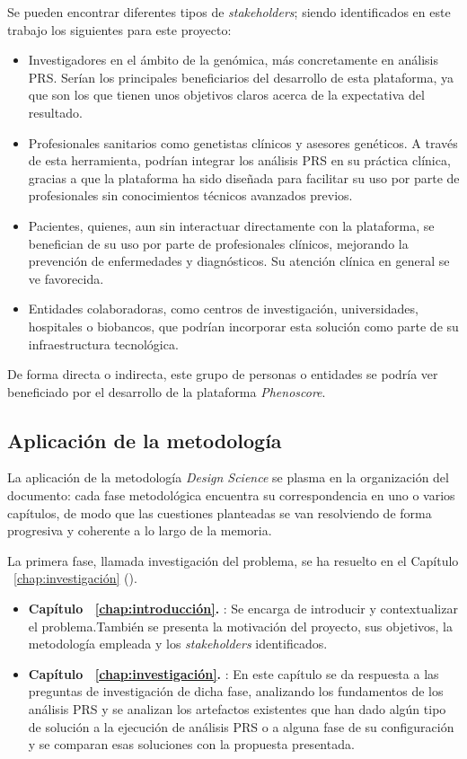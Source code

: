 Se pueden encontrar diferentes tipos de \textit{stakeholders}; siendo identificados en este trabajo los siguientes para este proyecto: 
\begin{itemize}
    \item Investigadores en el ámbito de la genómica, más concretamente en análisis PRS. Serían los principales beneficiarios del desarrollo de esta plataforma, ya que son los que tienen unos objetivos claros acerca de la expectativa del resultado.
    \item Profesionales sanitarios como genetistas clínicos y asesores genéticos. A través de esta herramienta, podrían integrar los análisis PRS en su práctica clínica, gracias a que la plataforma ha sido diseñada para facilitar su uso por parte de profesionales sin conocimientos técnicos avanzados previos.
    \item Pacientes, quienes, aun sin interactuar directamente con la plataforma, se benefician de su uso por parte de profesionales clínicos, mejorando la prevención de enfermedades y diagnósticos. Su atención clínica en general se ve favorecida.
    \item Entidades colaboradoras, como centros de investigación, universidades, hospitales o biobancos, que podrían incorporar esta solución como parte de su infraestructura tecnológica.
\end{itemize}
De forma directa o indirecta, este grupo de personas o entidades se podría ver beneficiado por el desarrollo de la plataforma \textit{Phenoscore}.

\subsection{Aplicación de la metodología}
La aplicación de la metodología \textit{Design Science} se plasma en la organización del documento: cada fase metodológica encuentra su correspondencia en uno o varios capítulos, de modo que las cuestiones planteadas se van resolviendo de forma progresiva y coherente a lo largo de la memoria.

La primera fase, llamada investigación del problema, se ha resuelto en el Capítulo ~\ref{chap:investigación} ().

\begin{itemize}
    \item \textbf{Capítulo ~\ref{chap:introducción}. }: Se encarga de introducir y contextualizar el problema.También se presenta la motivación del proyecto, sus objetivos, la metodología empleada y los \textit{stakeholders} identificados.
    \item \textbf{Capítulo ~\ref{chap:investigación}. }: En este capítulo se da respuesta a las preguntas de investigación de dicha fase, analizando los fundamentos de los análisis PRS y se analizan los artefactos existentes que han dado algún tipo de solución a la ejecución de análisis PRS o a alguna fase de su configuración y se comparan esas soluciones con la propuesta presentada.
\end{itemize}

